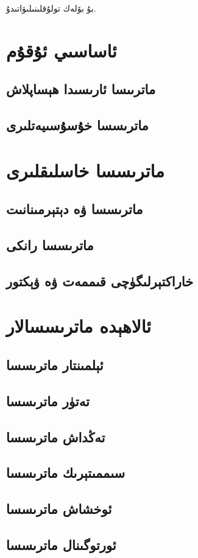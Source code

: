 بۇ بۆلەك تولۇقلىنىلىۋاتىدۇ.

\section{ئاساسىي ئۇقۇم}
\subsection{ماترىىسا ئارىسىدا ھېساپلاش}
\subsection{ماترىسسا خۇسۇسىيەتلىرى}

\section{ماترىسسا خاسلىقلىرى}
\subsection{ماترىسسا ۋە دېتېرمىنانىت}
\subsection{ماترىسسا رانكى}
\subsection{خاراكتېرلىگۈچى قىممەت ۋە ۋېكتور}


\section{ئالاھېدە ماترىسسالار}
\subsection{ئېلمىنتار ماترىسسا}
\subsection{تەتۈر ماترىسسا}
\subsection{تەڭداش ماترىسسا}
\subsection{سىممىتېرىك ماترىسسا}
\subsection{ئوخشاش ماترىسسا}
\subsection{ئورتوگىنال ماترىسسا}
